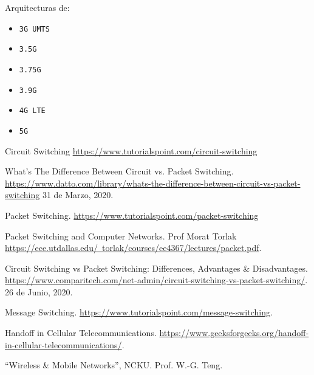 {\color{red} Arquitecturas de:}
\begin{itemize}
	\item {\color{red}\texttt{3G UMTS}}
	\item {\color{red}\texttt{3.5G}}
	\item {\color{red}\texttt{3.75G}}
	\item {\color{red}\texttt{3.9G}}
	\item {\color{red}\texttt{4G LTE}}
	\item {\color{red}\texttt{5G}}
\end{itemize}


\begin{thebibliography}{9}
Circuit Switching \href{https://www.tutorialspoint.com/circuit-switching}{https://www.tutorialspoint.com/circuit-switching}

What’s The Difference Between Circuit vs. Packet Switching. \href{https://www.datto.com/library/whats-the-difference-between-circuit-vs-packet-switching}{https://www.datto.com/library/whats-the-difference-between-circuit-vs-packet-switching} 31 de Marzo, 2020.


Packet Switching. \href{https://www.tutorialspoint.com/packet-switching}{https://www.tutorialspoint.com/packet-switching}



Packet Switching and Computer Networks. Prof Morat Torlak\\ \href{https://ece.utdallas.edu/~torlak/courses/ee4367/lectures/packet.pdf}{https://ece.utdallas.edu/~torlak/courses/ee4367/lectures/packet.pdf}.


Circuit Switching vs Packet Switching: Differences, Advantages \& Disadvantages. \href{https://www.comparitech.com/net-admin/circuit-switching-vs-packet-switching/}{https://www.comparitech.com/net-admin/circuit-switching-vs-packet-switching/}. 26 de Junio, 2020.


Message Switching. \href{https://www.tutorialspoint.com/message-switching}{https://www.tutorialspoint.com/message-switching}.


Handoff in Cellular Telecommunications. \href{https://www.geeksforgeeks.org/handoff-in-cellular-telecommunications/}{https://www.geeksforgeeks.org/handoff-in-cellular-telecommunications/}.

``Wireless \& Mobile Networks'', NCKU. Prof. W.-G. Teng. 

\end{thebibliography}

